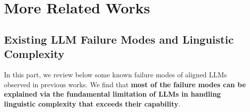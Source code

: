 \section{More Related Works}

\subsection{Existing LLM Failure Modes and Linguistic Complexity}
\label{sec:related:failure}
In this part, we review below some known failure modes of aligned LLMs observed in previous works. We find that \textbf{most of the failure modes can be explained via the fundamental limitation of LLMs in handling linguistic complexity that exceeds their capability}.



